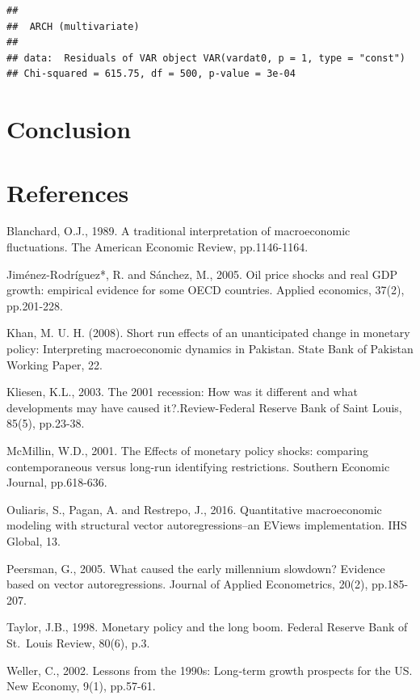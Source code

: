 \documentclass[11pt,preprint, authoryear]{elsarticle}
\numberwithin{equation}{section}
\numberwithin{figure}{section}
\numberwithin{table}{section}
\begin{document}
\begin{verbatim}
## 
##  ARCH (multivariate)
## 
## data:  Residuals of VAR object VAR(vardat0, p = 1, type = "const")
## Chi-squared = 615.75, df = 500, p-value = 3e-04
\end{verbatim}

\hypertarget{conclusion}{%
\section{Conclusion}\label{conclusion}}

\newpage

\hypertarget{references}{%
\section*{References}\label{references}}

Blanchard, O.J., 1989. A traditional interpretation of macroeconomic
fluctuations. The American Economic Review, pp.1146-1164.

Jiménez-Rodríguez*, R. and Sánchez, M., 2005. Oil price shocks and real
GDP growth: empirical evidence for some OECD countries. Applied
economics, 37(2), pp.201-228.

Khan, M. U. H. (2008). Short run effects of an unanticipated change in
monetary policy: Interpreting macroeconomic dynamics in Pakistan. State
Bank of Pakistan Working Paper, 22.

Kliesen, K.L., 2003. The 2001 recession: How was it different and what
developments may have caused it?.Review-Federal Reserve Bank of Saint
Louis, 85(5), pp.23-38.

McMillin, W.D., 2001. The Effects of monetary policy shocks: comparing
contemporaneous versus long-run identifying restrictions. Southern
Economic Journal, pp.618-636.

Ouliaris, S., Pagan, A. and Restrepo, J., 2016. Quantitative
macroeconomic modeling with structural vector autoregressions--an EViews
implementation. IHS Global, 13.

Peersman, G., 2005. What caused the early millennium slowdown? Evidence
based on vector autoregressions. Journal of Applied Econometrics, 20(2),
pp.185-207.

Taylor, J.B., 1998. Monetary policy and the long boom. Federal Reserve
Bank of St.~Louis Review, 80(6), p.3.

Weller, C., 2002. Lessons from the 1990s: Long‐term growth prospects for
the US. New Economy, 9(1), pp.57-61.
\end{document}
